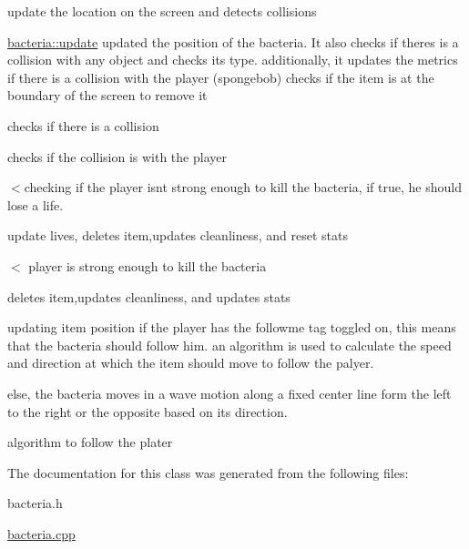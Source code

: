 update the location on the screen and detects collisions 

\hyperlink{classbacteria_abbc6e655d055d64b1f506248b598f03a}{bacteria\-::update} updated the position of the bacteria. It also checks if theres is a collision with any object and checks its type. additionally, it updates the metrics if there is a collision with the player (spongebob) checks if the item is at the boundary of the screen to remove it

checks if there is a collision

checks if the collision is with the player

$<$checking if the player isnt strong enough to kill the bacteria, if true, he should lose a life.

update lives, deletes item,updates cleanliness, and reset stats

$<$ player is strong enough to kill the bacteria

deletes item,updates cleanliness, and updates stats

updating item position if the player has the followme tag toggled on, this means that the bacteria should follow him. an algorithm is used to calculate the speed and direction at which the item should move to follow the palyer.

else, the bacteria moves in a wave motion along a fixed center line form the left to the right or the opposite based on its direction.

algorithm to follow the plater 

The documentation for this class was generated from the following files\-:\begin{DoxyCompactItemize}
\item 
bacteria.\-h\item 
\hyperlink{bacteria_8cpp}{bacteria.\-cpp}\end{DoxyCompactItemize}
